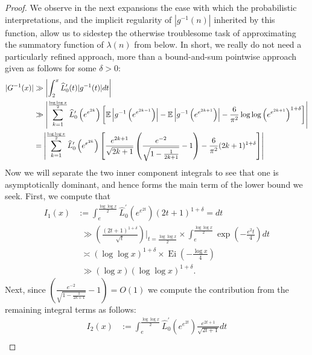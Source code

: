 \documentclass[11pt,reqno,a4letter]{article}
\numberwithin{figure}{section}
\numberwithin{table}{section}
\theoremstyle{plain}
\numberwithin{theorem}{section}
\theoremstyle{definition}
\begin{document}
\begin{proof}
We observe in the next expansions the ease with which the probabilistic interpretations, 
and the implicit regularity of $|g^{-1}(n)|$ inherited by this function, allow us 
to sidestep the otherwise troublesome task of approximating the summatory function of 
$\lambda(n)$ from below. In short, we really do not need a particularly refined approach, 
more than a bound-and-sum pointwise approach given as follows for some $\delta > 0$: 
\begin{align*} 
\notag 
|G^{-1}(x)| & \gg \left\lvert \int_2^x \widehat{L}_0^{\prime}(t) |g^{-1}(t)| dt \right\rvert \\ 
     & \gg \left\lvert \sum_{k=1}^{\frac{\log\log x}{2}} \widehat{L}_0^{\prime}\left(e^{e^{2k}}\right) \left[ 
     \mathbb{E}\left\lvert g^{-1}\left(e^{e^{2k-1}}\right) \right\rvert - 
     \mathbb{E}\left\lvert g^{-1}\left(e^{e^{2k+1}}\right) \right\rvert - 
     \frac{6}{\pi^2} \log\log\left(e^{e^{2k+1}}\right)^{1+\delta}  
     \right] \right\rvert \\ 
     & = \left\lvert \sum_{k=1}^{\frac{\log\log x}{2}} \widehat{L}_0^{\prime}\left(e^{e^{2k}}\right) \left[ 
     \frac{e^{2k+1}}{\sqrt{2k+1}} \left(\frac{e^{-2}}{\sqrt{1-\frac{1}{2k+1}}} - 1\right) 
     - \frac{6}{\pi^2} (2k+1)^{1+\delta}\right] \right\rvert
\end{align*} 
Now we will separate the two inner component integrals to see that one is asymptotically dominant, and hence 
forms the main term of the lower bound we seek. 
First, we compute that 
\begin{align*} 
I_1(x) & := \int_{e}^{\frac{\log\log x}{2}} \widehat{L}_0^{\prime}\left(e^{e^{2t}}\right) 
     (2t+1)^{1+\delta} = dt \\ 
     & \phantom{:} \gg \left(\frac{(2t+1)^{1+\delta}}{\sqrt{t}}\right) \Biggr\rvert_{t=\frac{\log\log x}{2}} \times 
     \int_{e}^{\frac{\log\log x}{2}} \exp\left(-\frac{e^2 t}{4}\right) dt \\ 
     & \phantom{:} \asymp (\log\log x)^{1+\delta} \times \operatorname{Ei}\left(-\frac{\log x}{4}\right) \\ 
     & \phantom{:} \gg (\log x) (\log\log x)^{1+\delta}. 
\end{align*} 
Next, since $\left(\frac{e^{-2}}{\sqrt{1-\frac{1}{2k+1}}} - 1\right) = O(1)$ we compute the contribution 
from the remaining integral terms as follows: 
\begin{align*} 
I_2(x) & := \int_{e}^{\frac{\log\log x}{2}} \widehat{L}_0^{\prime}\left(e^{e^{2t}}\right) 
     \frac{e^{2t+1}}{\sqrt{2t+1}} dt \\ 

\end{align*}
\end{proof}
\end{document}
